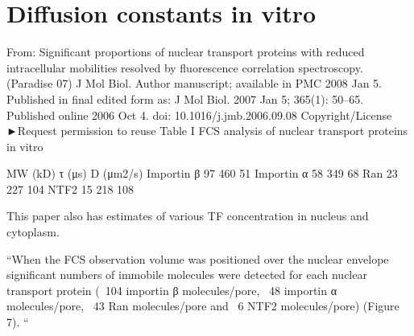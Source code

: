 \section{Diffusion constants in vitro}

From: Significant proportions of nuclear transport proteins with reduced intracellular mobilities resolved by fluorescence correlation spectroscopy. (Paradise 07)
J Mol Biol. Author manuscript; available in PMC 2008 Jan 5.
Published in final edited form as:
J Mol Biol. 2007 Jan 5; 365(1): 50–65.
Published online 2006 Oct 4. doi: 10.1016/j.jmb.2006.09.08
Copyright/License ►Request permission to reuse
Table I
FCS analysis of nuclear transport proteins in vitro

MW (kD)	τ (μs)	D (μm2/s)
Importin β	97	460	51
Importin α	58	349	68
Ran	23	227	104
NTF2	15	218	108

This paper also has estimates of various TF concentration in nucleus and cytoplasm.

``When the FCS observation volume was positioned over the nuclear envelope significant numbers of immobile molecules were detected for each nuclear transport protein (~104 importin β molecules/pore, ~48 importin α molecules/pore, ~43 Ran molecules/pore and ~6 NTF2 molecules/pore) (Figure 7). ``
















